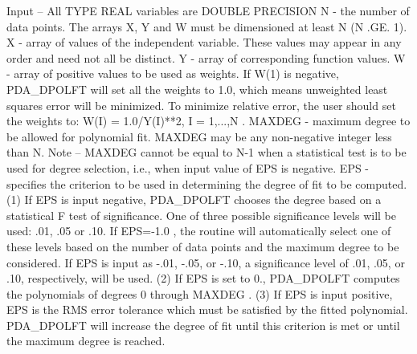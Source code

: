 \documentclass[11pt,twoside,nolof]{starlink}
\begin{document}
\begin{terminalv}
     Input -- All TYPE REAL variables are DOUBLE PRECISION
         N -      the number of data points.  The arrays X, Y and W
                  must be dimensioned at least  N  (N .GE. 1).
         X -      array of values of the independent variable.  These
                  values may appear in any order and need not all be
                  distinct.
         Y -      array of corresponding function values.
         W -      array of positive values to be used as weights.  If
                  W(1) is negative,  PDA_DPOLFT  will set all the weights
                  to 1.0, which means unweighted least squares error
                  will be minimized.  To minimize relative error, the
                  user should set the weights to:  W(I) = 1.0/Y(I)**2,
                  I = 1,...,N .
         MAXDEG - maximum degree to be allowed for polynomial fit.
                  MAXDEG  may be any non-negative integer less than  N.
                  Note -- MAXDEG  cannot be equal to  N-1  when a
                  statistical test is to be used for degree selection,
                  i.e., when input value of  EPS  is negative.
         EPS -    specifies the criterion to be used in determining
                  the degree of fit to be computed.
                  (1)  If  EPS  is input negative,  PDA_DPOLFT  chooses the
                       degree based on a statistical F test of
                       significance.  One of three possible
                       significance levels will be used:  .01, .05 or
                       .10.  If  EPS=-1.0 , the routine will
                       automatically select one of these levels based
                       on the number of data points and the maximum
                       degree to be considered.  If  EPS  is input as
                       -.01, -.05, or -.10, a significance level of
                       .01, .05, or .10, respectively, will be used.
                  (2)  If  EPS  is set to 0.,  PDA_DPOLFT  computes the
                       polynomials of degrees 0 through  MAXDEG .
                  (3)  If  EPS  is input positive,  EPS  is the RMS
                       error tolerance which must be satisfied by the
                       fitted polynomial.  PDA_DPOLFT  will increase the
                       degree of fit until this criterion is met or
                       until the maximum degree is reached.


\end{terminalv}
\end{document}

